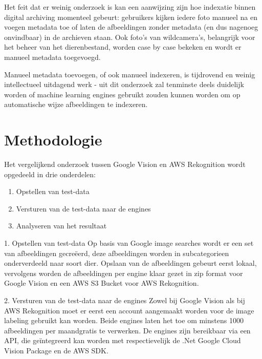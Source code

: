 Het feit dat er weinig onderzoek is kan een aanwijzing zijn hoe indexatie binnen digital archiving momenteel gebeurt: gebruikers kijken iedere foto manueel na en voegen metadata toe of laten de afbeeldingen zonder metadata (en dus nagenoeg onvindbaar) in de archieven staan.
Ook foto's van wildcamera's, belangrijk voor het beheer van het dierenbestand, worden case by case bekeken en wordt er manueel metadata toegevoegd.

Manueel metadata toevoegen, of ook manueel indexeren, is tijdrovend en weinig intellectueel uitdagend werk - uit dit onderzoek zal tenminste deels duidelijk worden of machine learning engines gebruikt zouden kunnen worden om op automatische wijze afbeeldingen te indexeren.




\section{Methodologie}
\label{sec:methodologie}

Het vergelijkend onderzoek tussen Google Vision en AWS Rekognition wordt opgedeeld in drie onderdelen:

\begin{enumerate}
    \item Opstellen van test-data
    \item Versturen van de test-data naar de engines
    \item Analyseren van het resultaat
\end{enumerate}

1. Opstellen van test-data
\linebreak
Op basis van Google image searches wordt er een set van afbeeldingen gecreëerd, deze afbeeldingen worden in subcategorieen onderverdeeld naar soort dier.
Opslaan van de afbeeldingen gebeurt eerst lokaal, vervolgens worden de afbeeldingen per engine klaar gezet in zip format voor Google Vision en een AWS S3 Bucket voor AWS Rekognition.

2. Versturen van de test-data naar de engines
\linebreak
Zowel bij Google Vision als bij AWS Rekognition moet er eerst een account aangemaakt worden voor de image labeling gebruikt kan worden. Beide engines laten het toe om minstens 1000 afbeeldingen  per maandgratis te verwerken. De engines zijn bereikbaar via een API, die geïntegreerd kan worden met respectievelijk de .Net Google Cloud Vision Package en de AWS SDK.

